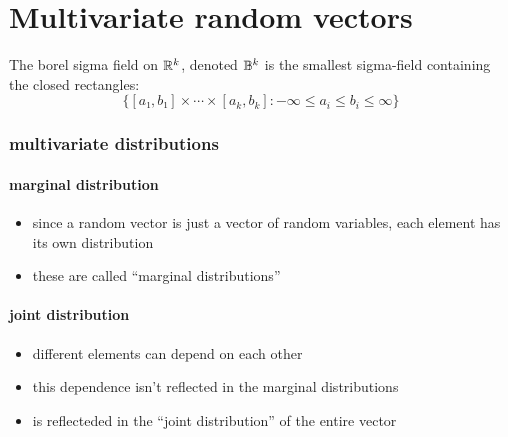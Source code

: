 

\part*{Multivariate random vectors}%

The borel sigma field on $\mathbb{R}^k$, denoted $\mathbb{B}^k$ is the smallest
sigma-field containing the closed rectangles:
\[\{[a₁,b₁] × ⋯ ×[a_k,b_k] : - ∞ ≤ a_i ≤ b_i ≤ ∞\}\]

\section{multivariate distributions}
\subsection{marginal distribution}

\begin{itemize}
\item since a random vector is just a vector of random variables, each
       element has its own distribution
\item these are called ``marginal distributions''
\end{itemize}

\subsection{joint distribution}

\begin{itemize}
\item different elements can depend on each other
\item this dependence isn't reflected in the marginal distributions
\item is reflecteded in the ``joint distribution'' of the entire vector
\end{itemize}

